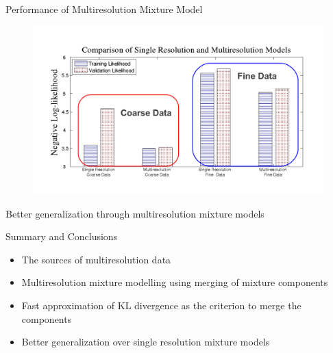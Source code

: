 \documentclass[first=orange,second=purple,logo=redexc]{aaltoslides}
\begin{document}



\begin{frame}{Performance of Multiresolution Mixture Model}
\vspace{-8mm}
\begin{figure}
\centering
  \includegraphics[trim=1.2cm 0cm 0cm 1cm, clip=true, width=1.05\textwidth]{figures/nbarlkhood}  
\end{figure}

\vspace{-10mm}

\scriptsize \hspace{15mm} Better generalization through multiresolution mixture models
\end{frame}


\begin{frame}{Summary and Conclusions}

\begin{itemize} \setlength{\itemsep}{5.5mm}
 \item The sources of multiresolution data
 \item Multiresolution mixture modelling using merging of mixture components
 \item Fast approximation of KL divergence as the criterion to merge the components
 \item Better generalization over single resolution mixture models
\end{itemize}
\end{frame}
\end{document}
